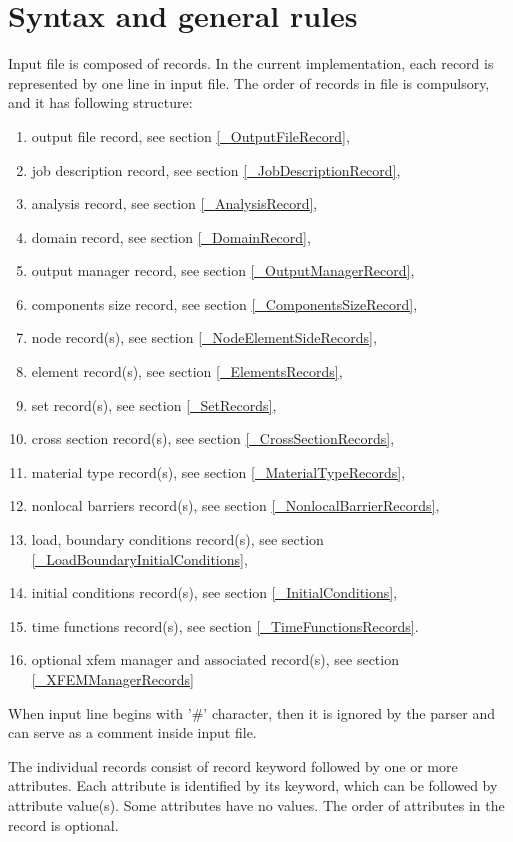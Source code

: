 \documentclass[a4paper]{report}
\begin{document}
\section{Syntax and general rules}

Input file is composed of records. In the current implementation, each record is represented by one line in input file.
The order of records in file is compulsory, and it has following structure:
\begin{enumerate}
\item output file record, see section \ref{_OutputFileRecord},
\item job description record, see section \ref{_JobDescriptionRecord},
\item analysis record, see section \ref{_AnalysisRecord},
\item domain record, see section \ref{_DomainRecord},
\item output manager record, see section \ref{_OutputManagerRecord},
\item components size record, see section \ref{_ComponentsSizeRecord},
\item node record(s), see section \ref{_NodeElementSideRecords},
\item element record(s), see section \ref{_ElementsRecords},
\item set record(s), see section \ref{_SetRecords},
\item cross section record(s), see section \ref{_CrossSectionRecords},
\item material type  record(s), see section \ref{_MaterialTypeRecords},
\item nonlocal barriers record(s), see section \ref{_NonlocalBarrierRecords},
\item load, boundary  conditions record(s), see section
  \ref{_LoadBoundaryInitialConditions},
\item initial conditions record(s), see section \ref{_InitialConditions},
\item time functions record(s), see section \ref{_TimeFunctionsRecords}.
\item optional xfem manager and associated record(s), see section \ref{_XFEMManagerRecords}
\end{enumerate}
When input line begins with '\#' character, then it is ignored  by the parser and
can serve as a comment inside input file.

The individual records consist of record keyword followed by one or more attributes. Each attribute is identified by
its keyword, which can be followed by attribute value(s). Some attributes have no values.
The order of attributes in the record is optional.
\end{document}
